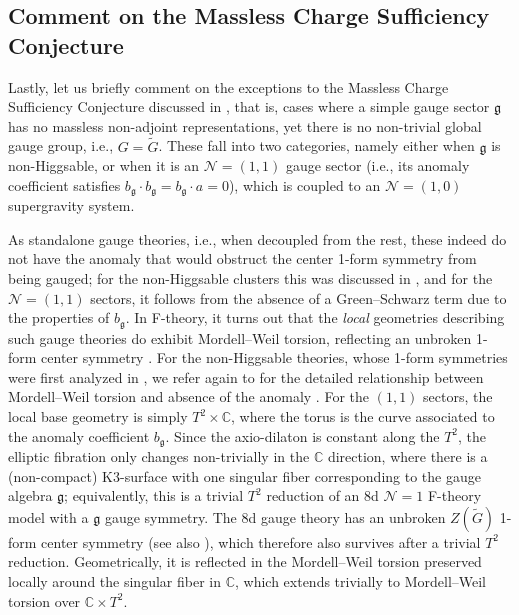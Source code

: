 \documentclass[11pt, a4paper]{article}
\newcommand*{\bbC}{\ensuremath{\mathbb{C}}}
\newcommand*{\cN}{\ensuremath{\mathcal{N}}}
\newcommand*{\fkg}{\ensuremath{\mathfrak{g}}}
\begin{document}
\subsection{Comment on the Massless Charge Sufficiency Conjecture}
\label{sec:comments}

Lastly, let us briefly comment on the exceptions to the Massless Charge Sufficiency Conjecture discussed in \cite{Morrison:2021wuv}, that is, cases where a simple gauge sector $\fkg$ has no massless non-adjoint representations, yet there is no non-trivial global gauge group, i.e., $G= \widetilde{G}$.
These fall into two categories, namely either when $\fkg$ is non-Higgsable, or when it is an $\cN=(1,1)$ gauge sector (i.e., its anomaly coefficient satisfies $b_\fkg \cdot b_\fkg = b_\fkg \cdot a = 0$), which is coupled to an $\cN=(1,0)$ supergravity system.


As standalone gauge theories, i.e., when decoupled from the rest, these indeed do not have the anomaly  that would obstruct the center 1-form symmetry from being gauged; for the non-Higgsable clusters this was discussed in \cite{Apruzzi:2020zot}, and for the $\cN=(1,1)$ sectors, it follows from the absence of a Green--Schwarz term due to the properties of $b_\fkg$.
In F-theory, it turns out that the \emph{local} geometries describing such gauge theories do exhibit Mordell--Weil torsion, reflecting an unbroken 1-form center symmetry \cite{Aspinwall:1998xj,Mayrhofer:2014opa,Cvetic:2021sxm}.
For the non-Higgsable theories, whose 1-form symmetries were first analyzed in \cite{Morrison:2020ool}, we refer again to \cite{Apruzzi:2020zot} for the detailed relationship between Mordell--Weil torsion and absence of the anomaly .
For the $(1,1)$ sectors, the local base geometry is simply $T^2 \times \bbC$, where the torus is the curve associated to the anomaly coefficient $b_\fkg$.
Since the axio-dilaton is constant along the $T^2$, the elliptic fibration only changes non-trivially in the $\bbC$ direction, where there is a (non-compact) K3-surface with one singular fiber corresponding to the gauge algebra $\fkg$; equivalently, this is a trivial $T^2$ reduction of an 8d $\cN=1$ F-theory model with a $\fkg$ gauge symmetry.
The 8d gauge theory has an unbroken $Z(\widetilde{G})$ 1-form center symmetry \cite{Cvetic:2021sxm} (see also \cite{Morrison:2020ool,Albertini:2020mdx}), which therefore also survives after a trivial $T^2$ reduction.
Geometrically, it is reflected in the Mordell--Weil torsion preserved locally around the singular fiber in $\bbC$, which extends trivially to Mordell--Weil torsion over $\bbC \times T^2$.
\end{document}
